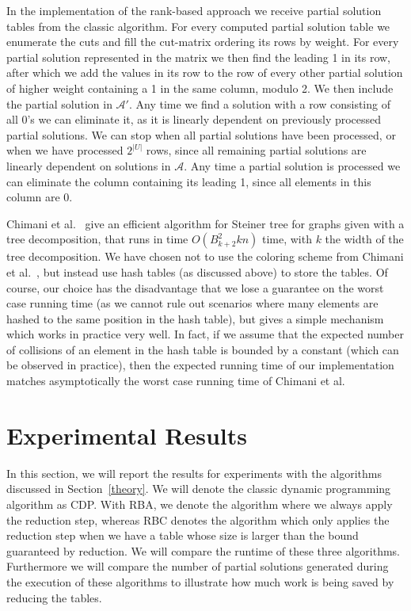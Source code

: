 \documentclass{llncs}
\begin{document}
In the implementation of the rank-based approach we receive partial solution tables from the classic algorithm.
For every computed partial solution table we enumerate the cuts and fill the cut-matrix ordering its rows by weight. For every partial solution represented in the matrix we then find the leading 1 in its row, after which we add the values in its row to the row of every other partial solution of higher weight containing a 1 in the same column, modulo 2. We then include the partial solution in $\mathcal{A'}$. Any time we find a solution with a row consisting of all 0's we can eliminate it, as it is linearly dependent on previously processed partial solutions. We can stop when all partial solutions have been processed, or when we have processed $2^{|U|}$ rows, since all remaining partial solutions are linearly dependent on solutions in $\mathcal{A}$. Any time a partial solution is processed we can eliminate the column containing its leading 1, since all elements in this column are 0.

Chimani et al.~\cite{ChimaniMZ12} give an efficient algorithm for Steiner tree for graphs given with a tree decomposition,
that runs in time $O(B^2_{k+2} k n)$ time, with $k$ the width of the tree decomposition. We have chosen not to use the
coloring scheme from Chimani et al.~\cite{ChimaniMZ12}, but instead use hash tables (as discussed above) to store the 
tables. Of course, our choice has the disadvantage that we lose a guarantee on the worst case running time (as we cannot
rule out scenarios where many elements are hashed to the same position in the hash table), but gives a simple mechanism
which works in practice very well. In fact, if we assume that the expected number of collisions of an element in the hash
table is bounded by a constant (which can be observed in practice), then the expected running time of our implementation
matches asymptotically  the worst case running time of Chimani et al.

\section{Experimental Results}
\label{section:results}
In this section, we will report the results for experiments with the algorithms discussed in Section~\ref{theory}. We will denote the classic dynamic programming algorithm as CDP. 
With RBA, we denote the algorithm where we always apply the reduction step,
whereas RBC denotes the algorithm which only applies the reduction step when we have a table whose size is larger than the bound guaranteed by reduction.
We will compare the runtime of these three algorithms. 
Furthermore we will compare the number of partial solutions generated during the execution of these algorithms to illustrate how much work is being saved by reducing the tables.
\end{document}
